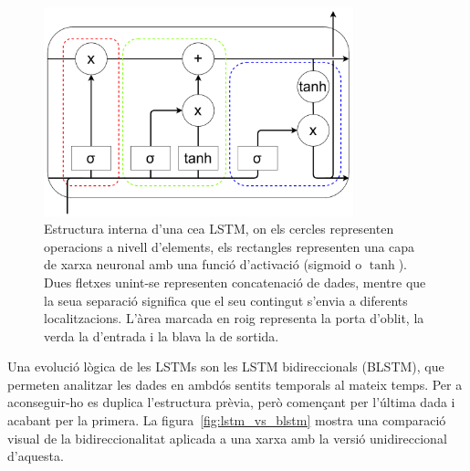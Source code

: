 \begin{figure}[ht!]
    \centering
    \includegraphics[width=0.8\textwidth]{figuras/estructura_lstm_cell.pdf}
    \caption{Estructura interna d'una ce\lgem a LSTM, on els cercles representen operacions a nivell d'elements, els rectangles representen una capa de xarxa neuronal amb una funció d'activació (sigmoid o $\tanh$). Dues fletxes unint-se representen concatenació de dades, mentre que la seua separació significa que el seu contingut s'envia a diferents localitzacions. L'àrea marcada en roig representa la porta d'oblit, la verda la d'entrada i la blava la de sortida.}
    \label{fig:estructura_lstm_cell}
\end{figure}

Una evolució lògica de les LSTMs son les LSTM bidireccionals (BLSTM), que permeten analitzar les dades en ambdós sentits temporals al mateix temps. Per a aconseguir-ho es duplica l'estructura prèvia, però començant per l'última dada i acabant per la primera. La figura~\ref{fig:lstm_vs_blstm} mostra una comparació visual de la bidireccionalitat aplicada a una xarxa amb la versió unidireccional d'aquesta.

